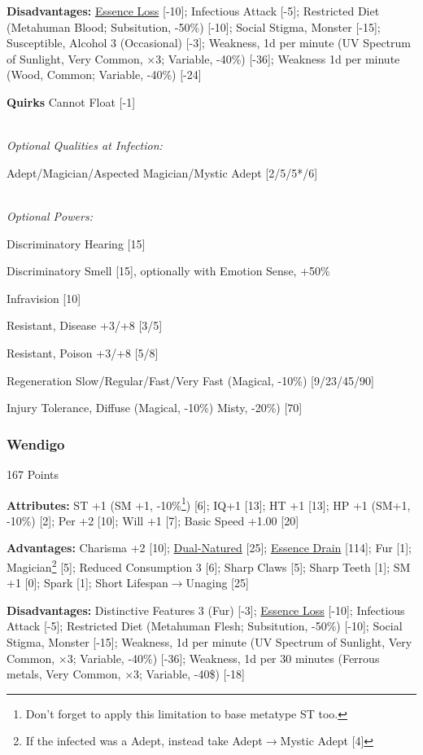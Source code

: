 \begin{multicols*}{3}
	\textbf{Disadvantages:}	
	\hyperref[essence_loss]{Essence Loss} [-10]; Infectious Attack [-5]; Restricted Diet (Metahuman Blood; Subsitution, -50\%) [-10]; Social Stigma, Monster [-15]; Susceptible, Alcohol 3 (Occasional) [-3]; Weakness, 1d per minute (UV Spectrum of Sunlight, Very Common, $\times$3; Variable, -40\%) [-36]; Weakness 1d per minute (Wood, Common; Variable, -40\%) [-24]
	
	\textbf{Quirks} 
	Cannot Float [-1]
	
	\textit{\\Optional Qualities at Infection:}
	
	Adept/Magician/Aspected Magician/Mystic Adept [2/5/5*/6]	
	
	\textit{\\Optional Powers:}
		
	Discriminatory Hearing [15]
	
	Discriminatory Smell [15], optionally with Emotion Sense, +50\%
	
	Infravision [10]
	
	Resistant, Disease +3/+8 [3/5]
	
	Resistant, Poison +3/+8 [5/8]
	
	Regeneration Slow/Regular/Fast/Very Fast (Magical, -10\%) [9/23/45/90]
	
	Injury Tolerance, Diffuse (Magical, -10\%) Misty, -20\%) [70]
	
	\subsubsection{Wendigo}\label{wendigo}
	\begin{flushright}
		167 Points
	\end{flushright}
		
	\textbf{Attributes:}
	ST +1 (SM +1, -10\%\footnote{Don't forget to apply this limitation to base metatype ST too.}) [6]; IQ+1 [13]; HT +1 [13]; HP +1 (SM+1, -10\%) [2]; Per +2 [10]; Will +1 [7]; Basic Speed +1.00 [20]
	
	\textbf{Advantages:}
	Charisma +2 [10]; \hyperref[dual_natured]{Dual-Natured} [25]; \hyperref[essence_drain]{Essence Drain} [114]; Fur [1]; Magician\footnote{If the infected was a Adept, instead take Adept$\rightarrow$Mystic Adept [4]} [5]; Reduced Consumption 3 [6]; Sharp Claws [5]; Sharp Teeth [1]; SM +1 [0]; Spark [1]; Short Lifespan$\rightarrow$Unaging [25]
	
	\textbf{Disadvantages:}	
	Distinctive Features 3 (Fur) [-3]; \hyperref[essence_loss]{Essence Loss} [-10]; Infectious Attack [-5]; Restricted Diet (Metahuman Flesh; Subsitution, -50\%) [-10]; Social Stigma, Monster [-15]; Weakness, 1d per minute (UV Spectrum of Sunlight, Very Common, $\times$3; Variable, -40\%) [-36]; Weakness, 1d per 30 minutes (Ferrous metals, Very Common, $\times$3; Variable, -40\$) [-18]
		

\end{multicols*}
